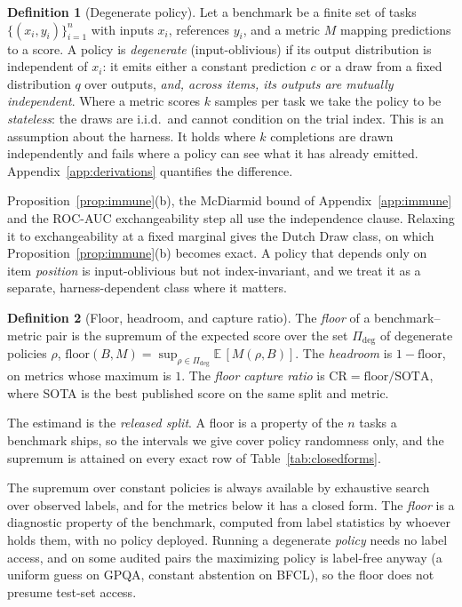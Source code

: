 \documentclass{article}
\theoremstyle{plain}
\theoremstyle{definition}
\newtheorem{definition}{Definition}
\newcommand{\CR}{\mathrm{CR}}
\begin{document}
\begin{definition}[Degenerate policy]
\label{def:degenerate}
Let a benchmark be a finite set of tasks $\{(x_i, y_i)\}_{i=1}^{n}$ with inputs $x_i$, references $y_i$, and a metric $M$ mapping predictions to a score. A policy is \emph{degenerate} (input-oblivious) if its output distribution is independent of $x_i$: it emits either a constant prediction $c$ or a draw from a fixed distribution $q$ over outputs, \emph{and, across items, its outputs are mutually independent}. Where a metric scores $k$ samples per task we take the policy to be \emph{stateless}: the draws are i.i.d.\ and cannot condition on the trial index. This is an assumption about the harness. It holds where $k$ completions are drawn independently and fails where a policy can see what it has already emitted. Appendix~\ref{app:derivations} quantifies the difference.
\end{definition}

Proposition~\ref{prop:immune}(b), the McDiarmid bound of Appendix~\ref{app:immune} and the ROC-AUC exchangeability step all use the independence clause. Relaxing it to exchangeability at a fixed marginal gives the Dutch Draw class, on which Proposition~\ref{prop:immune}(b) becomes exact. A policy that depends only on item \emph{position} is input-oblivious but not index-invariant, and we treat it as a separate, harness-dependent class where it matters.

\begin{definition}[Floor, headroom, and capture ratio]
\label{def:floor}
The \emph{floor} of a benchmark--metric pair is the supremum of the expected score over the set $\Pi_{\mathrm{deg}}$ of degenerate policies $\rho$,
$\mathrm{floor}(B, M) = \sup_{\rho \in \Pi_{\mathrm{deg}}} \mathbb{E}\,[M(\rho, B)]$.
The \emph{headroom} is $1 - \mathrm{floor}$, on metrics whose maximum is $1$. The \emph{floor capture ratio} is $\CR = \mathrm{floor}/\mathrm{SOTA}$, where SOTA is the best published score on the same split and metric.
\end{definition}

The estimand is the \emph{released split}. A floor is a property of the $n$ tasks a benchmark ships, so the intervals we give cover policy randomness only, and the supremum is attained on every exact row of Table~\ref{tab:closedforms}.

The supremum over constant policies is always available by exhaustive search over observed labels, and for the metrics below it has a closed form. The \emph{floor} is a diagnostic property of the benchmark, computed from label statistics by whoever holds them, with no policy deployed. Running a degenerate \emph{policy} needs no label access, and on some audited pairs the maximizing policy is label-free anyway (a uniform guess on GPQA, constant abstention on BFCL), so the floor does not presume test-set access.
\end{document}
